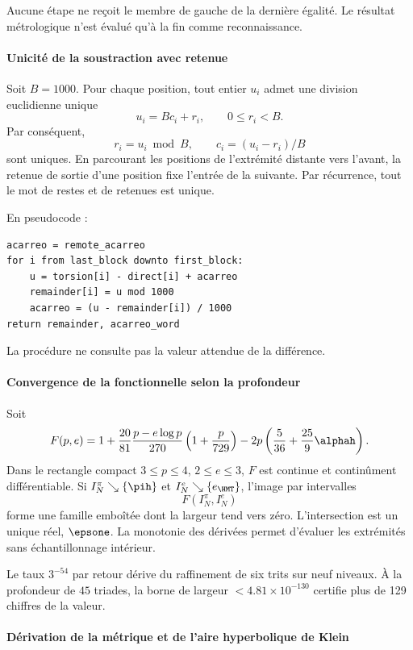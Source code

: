 Aucune étape ne reçoit le membre de gauche de la dernière égalité. Le résultat
métrologique n'est évalué qu'à la fin comme reconnaissance.

\paragraph{Unicité de la soustraction avec retenue}

Soit \(B=1000\). Pour chaque position, tout entier \(u_i\) admet une division
euclidienne unique
\[
u_i=Bc_i+r_i,\qquad 0\le r_i<B.
\]
Par conséquent,
\[
r_i=u_i\bmod B,\qquad c_i=(u_i-r_i)/B
\]
sont uniques. En parcourant les positions de l'extrémité distante vers
l'avant, la retenue de sortie d'une position fixe l'entrée de la suivante.
Par récurrence, tout le mot de restes et de retenues est unique.

En pseudocode :
\begin{verbatim}
acarreo = remote_acarreo
for i from last_block downto first_block:
    u = torsion[i] - direct[i] + acarreo
    remainder[i] = u mod 1000
    acarreo = (u - remainder[i]) / 1000
return remainder, acarreo_word
\end{verbatim}
La procédure ne consulte pas la valeur attendue de la différence.

\paragraph{Convergence de la fonctionnelle selon la profondeur}

Soit
\[
F(p,e)=1+\frac{20}{81}
\frac{p-e\log p}{270}\left(1+\frac{p}{729}\right)
-2p\left(\frac5{36}+\frac{25}{9}\alphah\right).
\]
Dans le rectangle compact \(3\le p\le4\), \(2\le e\le3\), \(F\) est
continue et continûment différentiable. Si \(I_N^\pi\searrow\{\pih\}\) et
\(I_N^e\searrow\{e_{\HMT}\}\), l'image par intervalles
\[
F(I_N^\pi,I_N^e)
\]
forme une famille emboîtée dont la largeur tend vers zéro. L'intersection est un
unique réel, \(\epsone\). La monotonie des dérivées permet d'évaluer les
extrémités sans échantillonnage intérieur.

Le taux \(3^{-54}\) par retour dérive du raffinement de six trits sur
neuf niveaux. À la profondeur de \(45\) triades, la borne de largeur
\(<4.81\times10^{-130}\) certifie plus de 129 chiffres de la valeur.

\paragraph{Dérivation de la métrique et de l'aire hyperbolique de Klein}

